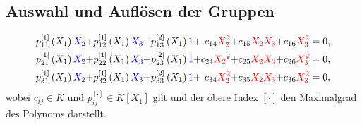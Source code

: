 \documentclass[11pt]{beamer}
\theoremstyle{custom}
\theoremstyle{custom}
\begin{document}
	\subsection*{Auswahl und Auflösen der Gruppen}
	\begin{frame}
		\begin{equation}\label{eqn:E3Q3}
			\begin{alignedat}{6}
				&p_{11}^{\left[1\right] }\left(X_{1}\right)\textcolor{blue}{X_{2}}+
				&p_{12}^{\left[1\right] }\left(X_{1}\right)\textcolor{blue}{X_{3}}+
				&p_{13}^{\left[2\right] }\left(X_{1}\right)\textcolor{blue}{1}+
				&c_{14}\textcolor{red}{X_{2}^2}+&c_{15}\textcolor{red}{X_{2}X_{3}}+&c_{16}\textcolor{red}{X_{3}^2}=0,\\
				&p_{21}^{\left[1\right] }\left(X_{1}\right)\textcolor{blue}{X_{2}}+
				&p_{22}^{\left[1\right] }\left(X_{1}\right)\textcolor{blue}{X_{3}}+
				&p_{23}^{\left[2\right] }\left(X_{1}\right)\textcolor{blue}{1}+
				&c_{24}\textcolor{red}{X_{2}}^2+&c_{25}\textcolor{red}{X_{2}X_{3}}+&c_{26}\textcolor{red}{X_{3}^2}=0,\\
				&p_{31}^{\left[1\right] }\left(X_{1}\right)\textcolor{blue}{X_{2}}+
				&p_{32}^{\left[1\right] }\left(X_{1}\right)\textcolor{blue}{X_{3}}+
				&p_{33}^{\left[2\right] }\left(X_{1}\right)\textcolor{blue}{1}+
				&c_{34}\textcolor{red}{X_{2}^2}+&c_{35}\textcolor{red}{X_{2}X_{3}}+&c_{36}\textcolor{red}{X_{3}^2}=0,
			\end{alignedat}
		\end{equation}
		wobei $c_{ij} \in K$ und $p_{ij}^{\left[\cdot \right] } \in K\left[ X_{1}\right]$ gilt und der obere Index $\left[\cdot \right]$ den Maximalgrad des Polynoms darstellt.
	\end{frame}
\end{document}
